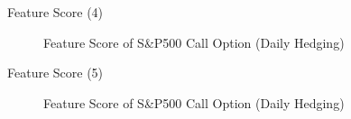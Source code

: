 \documentclass[10pt,table,mathserif]{beamer}
\begin{document}
\begin{frame}[fragile]{Feature Score (4)}
\begin{figure}[htp]
  \centering
  \caption{Feature Score of S\&P500 Call Option (Daily Hedging)} \label{fig:call1}
\end{figure}
\end{frame}



\begin{frame}[fragile]{Feature Score (5)}
\begin{figure}[htp]
  \centering
  \caption{Feature Score of S\&P500 Call Option (Daily Hedging)} \label{fig:call1}
\end{figure}
\end{frame}
\end{document}
